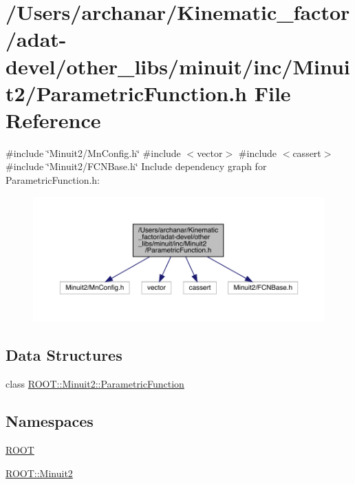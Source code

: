 \hypertarget{adat-devel_2other__libs_2minuit_2inc_2Minuit2_2ParametricFunction_8h}{}\section{/\+Users/archanar/\+Kinematic\+\_\+factor/adat-\/devel/other\+\_\+libs/minuit/inc/\+Minuit2/\+Parametric\+Function.h File Reference}
\label{adat-devel_2other__libs_2minuit_2inc_2Minuit2_2ParametricFunction_8h}
{\ttfamily \#include \char`\"{}Minuit2/\+Mn\+Config.\+h\char`\"{}}\newline
{\ttfamily \#include $<$vector$>$}\newline
{\ttfamily \#include $<$cassert$>$}\newline
{\ttfamily \#include \char`\"{}Minuit2/\+F\+C\+N\+Base.\+h\char`\"{}}\newline
Include dependency graph for Parametric\+Function.\+h\+:
\nopagebreak
\begin{figure}[H]
\begin{center}
\leavevmode
\includegraphics[width=350pt]{d5/d9d/adat-devel_2other__libs_2minuit_2inc_2Minuit2_2ParametricFunction_8h__incl}
\end{center}
\end{figure}
\subsection*{Data Structures}
\begin{DoxyCompactItemize}
\item 
class \mbox{\hyperlink{classROOT_1_1Minuit2_1_1ParametricFunction}{R\+O\+O\+T\+::\+Minuit2\+::\+Parametric\+Function}}
\end{DoxyCompactItemize}
\subsection*{Namespaces}
\begin{DoxyCompactItemize}
\item 
 \mbox{\hyperlink{namespaceROOT}{R\+O\+OT}}
\item 
 \mbox{\hyperlink{namespaceROOT_1_1Minuit2}{R\+O\+O\+T\+::\+Minuit2}}
\end{DoxyCompactItemize}
